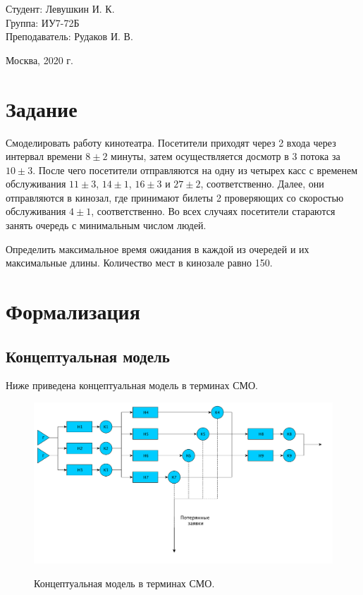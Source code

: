 \documentclass[a4paper,12pt]{article}
\begin{document}
	\large
	\begin{flushright}
		Студент: Левушкин И. К. \\
		Группа: ИУ7-72Б \\
		Преподаватель: Рудаков И. В. \\
	\end{flushright}
	
	\vspace*{25mm}
	\begin{center}
		Москва, 2020 г.  
	\end{center}
	\thispagestyle{empty}
	
	
	\newpage
	
	\section*{Задание}
	
	Смоделировать работу кинотеатра. Посетители приходят через 2 входа через интервал времени $8 \pm 2$ минуты, затем осуществляется досмотр в 3 потока за $10 \pm 3$. После чего посетители отправляются на одну из четырех касс с временем обслуживания $11 \pm 3$, $14 \pm 1$,  $16 \pm 3$ и $27 \pm 2$, соответственно. Далее, они отправляются в кинозал, где принимают билеты 2 проверяющих со скоростью обслуживания $4 \pm 1$, соответственно. Во всех случаях посетители стараются занять очередь с минимальным числом людей.
	
	Определить максимальное время ожидания в каждой из очередей и их максимальные длины.
	Количество мест в кинозале равно 150.
	
	\newpage
	
	\section*{Формализация}
	
	\subsection*{Концептуальная модель}
	
	Ниже приведена концептуальная модель в терминах СМО.
	
	\begin{figure}[h!]
		\begin{center}
			{\includegraphics[scale = 0.4]{model.pdf}}
			\label{ris:model}
		\end{center}
		\caption{Концептуальная модель в терминах СМО.}
	\end{figure}
	
\end{document}
